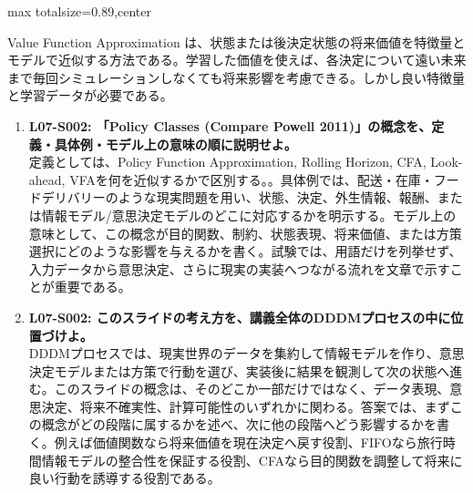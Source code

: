 \begin{minipage}[t]{0.58\textwidth}
\begin{adjustbox}{max totalsize={\textwidth}{0.89\textheight},center}
\begin{minipage}{\textwidth}
Value Function Approximation は、状態または後決定状態の将来価値を特徴量とモデルで近似する方法である。学習した価値を使えば、各決定について遠い未来まで毎回シミュレーションしなくても将来影響を考慮できる。しかし良い特徴量と学習データが必要である。\par{}\begin{enumerate}\item \textbf{L07-S002: 「Policy Classes (Compare Powell 2011)」の概念を、定義・具体例・モデル上の意味の順に説明せよ。}\\定義としては、Policy Function Approximation, Rolling Horizon, CFA, Look-ahead, VFAを何を近似するかで区別する。。具体例では、配送・在庫・フードデリバリーのような現実問題を用い、状態、決定、外生情報、報酬、または情報モデル/意思決定モデルのどこに対応するかを明示する。モデル上の意味として、この概念が目的関数、制約、状態表現、将来価値、または方策選択にどのような影響を与えるかを書く。試験では、用語だけを列挙せず、入力データから意思決定、さらに現実の実装へつながる流れを文章で示すことが重要である。\item \textbf{L07-S002: このスライドの考え方を、講義全体のDDDMプロセスの中に位置づけよ。}\\DDDMプロセスでは、現実世界のデータを集約して情報モデルを作り、意思決定モデルまたは方策で行動を選び、実装後に結果を観測して次の状態へ進む。このスライドの概念は、そのどこか一部だけではなく、データ表現、意思決定、将来不確実性、計算可能性のいずれかに関わる。答案では、まずこの概念がどの段階に属するかを述べ、次に他の段階へどう影響するかを書く。例えば価値関数なら将来価値を現在決定へ戻す役割、FIFOなら旅行時間情報モデルの整合性を保証する役割、CFAなら目的関数を調整して将来に良い行動を誘導する役割である。\end{enumerate}
\end{minipage}
\end{adjustbox}
\end{minipage}


